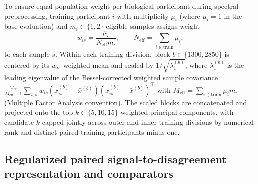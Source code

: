 \documentclass[preprint,12pt]{elsarticle}
\begin{document}
To ensure equal population weight per biological participant during spectral preprocessing, training participant $i$ with multiplicity $\mu_i$ (where $\mu_i = 1$ in the base evaluation) and $m_i \in \{1, 2\}$ eligible samples assigns weight
\begin{equation}
w_{is} = \frac{\mu_i}{N_{\text{eff}} m_i}, \qquad N_{\text{eff}} = \sum_{i \in \text{train}} \mu_i,
\label{eq:sample_weights}
\end{equation}
to each sample $s$. Within each training division, block $b \in \{1300, 2850\}$ is centered by its $w_{is}$-weighted mean and scaled by $1/\sqrt{\lambda_1^{(b)}}$, where $\lambda_1^{(b)}$ is the leading eigenvalue of the Bessel-corrected weighted sample covariance $\frac{M_{\text{eff}}}{M_{\text{eff}} - 1}\sum_{i,s} w_{is} (x_{is}^{(b)} - \bar{x}^{(b)})(x_{is}^{(b)} - \bar{x}^{(b)})^\top$ with $M_{\text{eff}} = \sum_{i \in \text{train}} \mu_i m_i$ (Multiple Factor Analysis convention). The scaled blocks are concatenated and projected onto the top $k \in \{5, 10, 15\}$ weighted principal components, with candidate $k$ capped jointly across outer and inner training divisions by numerical rank and distinct paired training participants minus one.

\subsection{Regularized paired signal-to-disagreement representation and comparators}
\label{subsec:eigensolver}
\end{document}
